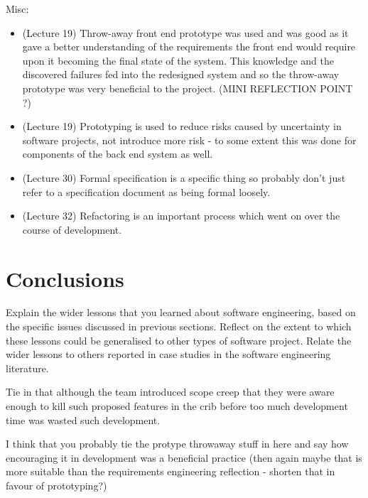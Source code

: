 \documentclass{l3proj}
\begin{document}
Misc:
\begin{itemize}
\item (Lecture 19) Throw-away front end prototype was used and was good as it gave a better understanding of the requirements the front end would require upon it becoming the final state of the system. This knowledge and the discovered failures fed into the redesigned system and so the throw-away prototype was very beneficial to the project. (MINI REFLECTION POINT ?)
\item (Lecture 19) Prototyping is used to reduce risks caused by uncertainty in software projects, not introduce more risk - to some extent this was done for components of the back end system as well.
\item (Lecture 30) Formal specification is a specific thing so probably don't just refer to a specification document as being formal loosely.
\item (Lecture 32) Refactoring is an important process which went on over the course of development.
\end{itemize}


\section{Conclusions}
\label{sec:conclusions}


Explain the wider lessons that you learned about software engineering,
based on the specific issues discussed in previous sections.  Reflect
on the extent to which these lessons could be generalised to other
types of software project.  Relate the wider lessons to others
reported in case studies in the software engineering literature.

Tie in that although the team introduced scope creep that they were aware enough to kill such proposed features in the crib before too much development time was wasted such development.

I think that you probably tie the protype throwaway stuff in here and say how encouraging it in development was a beneficial practice (then again maybe that is more suitable than the requirements engineering reflection - shorten that in favour of prototyping?)
\end{document}
